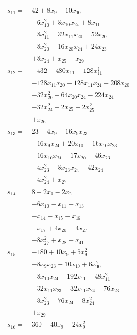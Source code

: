 \begin{longtable}{@{}r@{\;}l@{}}
\(s_{11}=\) & \(\displaystyle 42 +8x_{9} -10x_{10}\) \\
 & \(\displaystyle -6x_{10}^{2} +8x_{10}x_{24} +8x_{11}\) \\
 & \(\displaystyle -8x_{11}^{2} -32x_{11}x_{20} -52x_{20}\) \\
 & \(\displaystyle -8x_{20}^{2} -16x_{20}x_{24} +24x_{23}\) \\
 & \(\displaystyle +8x_{24} +x_{25} -x_{29}\) \\[3pt]
\(s_{12}=\) & \(\displaystyle -432 -480x_{11} -128x_{11}^{2}\) \\
 & \(\displaystyle -128x_{11}x_{20} -128x_{11}x_{24} -208x_{20}\) \\
 & \(\displaystyle -32x_{20}^{2} -64x_{20}x_{24} -224x_{24}\) \\
 & \(\displaystyle -32x_{24}^{2} -2x_{25} -2x_{25}^{2}\) \\
 & \(\displaystyle +x_{26}\) \\[3pt]
\(s_{13}=\) & \(\displaystyle 23 -4x_{9} -16x_{9}x_{23}\) \\
 & \(\displaystyle -16x_{9}x_{24} +20x_{10} -16x_{10}x_{23}\) \\
 & \(\displaystyle -16x_{10}x_{24} -17x_{20} -46x_{23}\) \\
 & \(\displaystyle -4x_{23}^{2} -8x_{23}x_{24} -42x_{24}\) \\
 & \(\displaystyle -4x_{24}^{2} +x_{27}\) \\[3pt]
\(s_{14}=\) & \(\displaystyle 8 -2x_{0} -2x_{2}\) \\
 & \(\displaystyle -6x_{10} -x_{11} -x_{13}\) \\
 & \(\displaystyle -x_{14} -x_{15} -x_{16}\) \\
 & \(\displaystyle -x_{17} +4x_{20} -4x_{27}\) \\
 & \(\displaystyle -8x_{27}^{2} +x_{28} -x_{41}\) \\[3pt]
\(s_{15}=\) & \(\displaystyle -180 +10x_{9} +6x_{9}^{2}\) \\
 & \(\displaystyle -8x_{9}x_{23} +10x_{10} +6x_{10}^{2}\) \\
 & \(\displaystyle -8x_{10}x_{24} -192x_{11} -48x_{11}^{2}\) \\
 & \(\displaystyle -32x_{11}x_{23} -32x_{11}x_{24} -76x_{23}\) \\
 & \(\displaystyle -8x_{23}^{2} -76x_{24} -8x_{24}^{2}\) \\
 & \(\displaystyle +x_{29}\) \\[3pt]
\(s_{16}=\) & \(\displaystyle 360 -40x_{9} -24x_{9}^{2}\) \\

\end{longtable}
